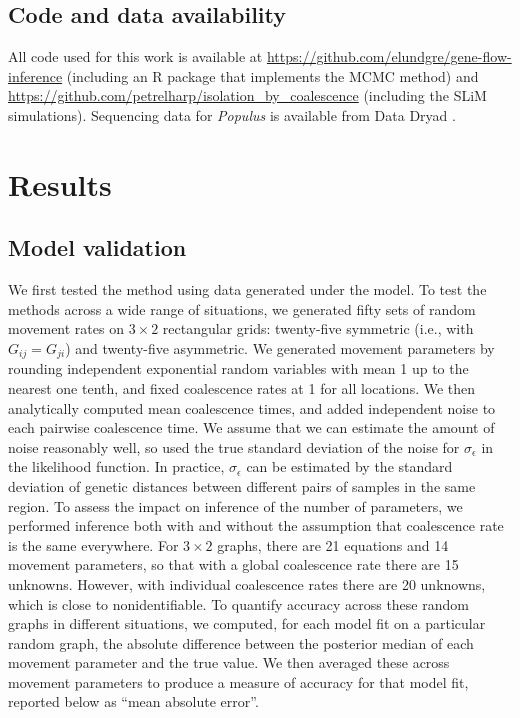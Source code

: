 \documentclass{article}
\begin{document}
\subsection*{Code and data availability}

All code used for this work is available at \url{https://github.com/elundgre/gene-flow-inference}
(including an R package that implements the MCMC method)
and \url{https://github.com/petrelharp/isolation_by_coalescence} (including the SLiM simulations).
Sequencing data for \textit{Populus} is available from Data Dryad \citep{geraldes2014data}.



\section*{Results}



\subsection*{Model validation}

We first tested the method using data generated under the model.
To test the methods across a wide range of situations,
we generated fifty sets of random movement rates on $3 \times 2$ rectangular grids:
twenty-five symmetric (i.e., with $G_{ij} = G_{ji}$) and twenty-five asymmetric.
We generated movement parameters
by rounding independent exponential random variables with mean 1 up to the nearest one tenth, 
and fixed coalescence rates at 1 for all locations.
We then analytically computed mean coalescence times,
and added independent noise to each pairwise coalescence time.
We assume that we can estimate the amount of noise reasonably well, 
so used the true standard deviation of the noise for $\sigma_\epsilon$ in the likelihood function.
In practice, $\sigma_\epsilon$ can be estimated by the standard deviation
of genetic distances between different pairs of samples in the same region.
To assess the impact on inference of the number of parameters,
we performed inference both with and without the assumption 
that coalescence rate is the same everywhere.
For $3 \times 2$ graphs, there are 21 equations
and 14 movement parameters,
so that with a global coalescence rate there are 15 unknowns.
However, with individual coalescence rates there are 20 unknowns,
which is close to nonidentifiable.
To quantify accuracy across these random graphs in different situations,
we computed, for each model fit on a particular random graph,
the absolute difference between the posterior median of each movement parameter
and the true value.
We then averaged these across movement parameters to produce a measure of accuracy for that model fit,
reported below as ``mean absolute error''.
\end{document}
